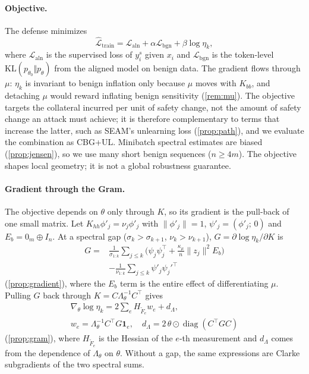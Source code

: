 \documentclass[11pt]{article}
\newcommand{\Laln}{\mathcal{L}_{\mathrm{aln}}}
\newcommand{\Lbgn}{\mathcal{L}_{\mathrm{bgn}}}
\newcommand{\Lam}{\Lambda_{\theta}}
\newcommand{\Ft}{\widetilde{F}}
\newcommand{\etak}{\eta_{k}}
\begin{document}
\paragraph{Objective.}
The defense minimizes
\begin{equation}
\widehat{\mathcal L}_{\mathrm{train}}=\Laln+\alpha\Lbgn+\beta\log\etak ,
\label{eq:training_objective}
\end{equation}
where $\Laln$ is the supervised loss of $y_i^s$ given $x_i$ and $\Lbgn$ is the token-level $\mathrm{KL}(p_{\theta_0}\Vert p_\theta)$ from the aligned model on benign data. The gradient flows through $\mu$: $\etak$ is invariant to benign inflation only because $\mu$ moves with $K_{bb}$, and detaching $\mu$ would reward inflating benign sensitivity (\cref{rem:mu}). The objective targets the collateral incurred per unit of safety change, not the amount of safety change an attack must achieve; it is therefore complementary to terms that increase the latter, such as SEAM's unlearning loss (\cref{prop:path}), and we evaluate the combination as CBG+UL. Minibatch spectral estimates are biased (\cref{prop:jensen}), so we use many short benign sequences ($n\ge4m$). The objective shapes local geometry; it is not a global robustness guarantee.

\paragraph{Gradient through the Gram.}
The objective depends on $\theta$ only through $K$, so its gradient is the pull-back of one small matrix. Let $K_{hh}\phi'_j=\nu_j\phi'_j$ with $\|\phi'_j\|=1$, $\psi'_j=(\phi'_j;\,0)$ and $E_b=0_m\oplus I_n$. At a spectral gap ($\sigma_k>\sigma_{k+1}$, $\nu_k>\nu_{k+1}$), $G=\partial\log\etak/\partial K$ is
\begin{equation}
\begin{aligned}
G={}&\frac{1}{\sigma_{1:k}}\textstyle\sum_{j\le k}\bigl(\psi_j\psi_j^\top+\tfrac{\kappa_\mu}{n}\|z_j\|^2E_b\bigr)\\
&-\frac{1}{\nu_{1:k}}\textstyle\sum_{j\le k}\psi'_j\psi_j'^\top
\end{aligned}
\label{eq:G}
\end{equation}
(\cref{prop:gradient}), where the $E_b$ term is the entire effect of differentiating $\mu$. Pulling $G$ back through $K=C\Lam^{-1}C^\top$ gives
\begin{equation}
\begin{gathered}
\nabla_\theta\log\etak=2\textstyle\sum_{e}H_{\Ft_e}w_e+d_\Lambda,\\
w_e=\Lam^{-1}C^\top G\mathbf 1_e,\quad d_\Lambda=2\,\theta\odot\operatorname{diag}(C^\top GC)
\end{gathered}
\label{eq:gram_grad}
\end{equation}
(\cref{prop:gram}), where $H_{\Ft_e}$ is the Hessian of the $e$-th measurement and $d_\Lambda$ comes from the dependence of $\Lam$ on $\theta$. Without a gap, the same expressions are Clarke subgradients of the two spectral sums.
\end{document}
